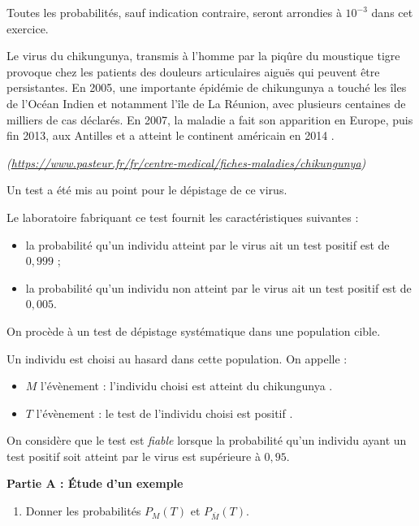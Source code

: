 \medskip

Toutes les probabilités, sauf indication contraire, seront arrondies à $10^{-3}$ dans cet exercice.

\og Le virus du chikungunya, transmis à l'homme par la piqûre du moustique tigre provoque chez les patients des douleurs articulaires aiguës qui peuvent être persistantes. En 2005, une importante épidémie de chikungunya a touché les îles de l'Océan Indien et notamment l'île de La Réunion, avec plusieurs centaines de milliers de cas déclarés. En 2007, la maladie a fait son apparition en Europe, puis fin 2013, aux Antilles et a atteint le continent américain en 2014 \fg{}.

\emph{(\href{https://www.pasteur.fr/fr/centre-medical/fiches-maladies/chikungunya}{https://www.pasteur.fr/fr/centre-medical/fiches-maladies/chikungunya})}

Un test a été mis au point pour le dépistage de ce virus.

Le laboratoire fabriquant ce test fournit les caractéristiques suivantes :

\begin{itemize}
\item la probabilité qu'un individu atteint par le virus ait un test positif est de $0,999$ ;
\item la probabilité qu'un individu non atteint par le virus ait un test positif est de $0,005$.
\end{itemize}

On procède à un test de dépistage systématique dans une population cible.

Un individu est choisi au hasard dans cette population. On appelle :

\begin{itemize}
\item $M$ l'évènement : \og l'individu choisi est atteint du chikungunya \fg.
\item $T$ l'évènement : \og le test de l'individu choisi est positif \fg.
\end{itemize}

On considère que le test est \emph{fiable} lorsque la probabilité qu'un individu ayant un test positif soit atteint par le virus est supérieure à $0,95$.

\bigskip

\textbf{Partie A : Étude d'un exemple}

\begin{enumerate}
\item Donner les probabilités $P_{M}(T)$ et $P_{\overline{M}}(T)$.
\end{enumerate} 


